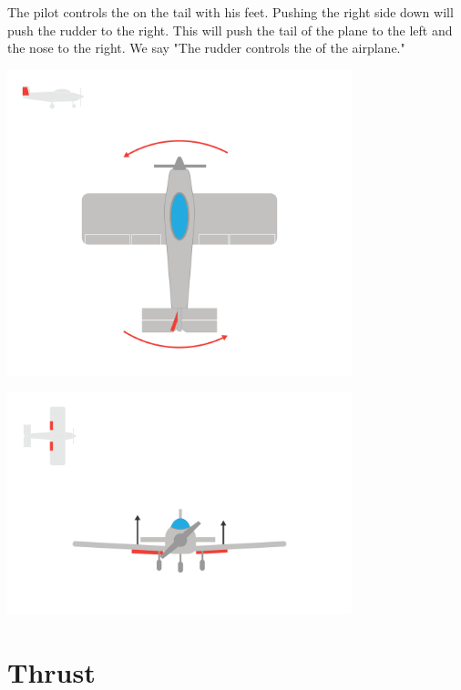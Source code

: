 The pilot controls the  on the tail with his feet. Pushing the right side down will push the rudder to the right.  This will push the tail of the plane to the left and the 
nose to the right.  We say "The rudder controls the  of the airplane."

\begin{center}
    \includegraphics[width=0.75\textwidth]{rudder.png}
    
\end{center}\begin{center}
    
    \includegraphics[width=0.75\textwidth]{flaps.png}
    
    
\end{center}


\section{Thrust}

